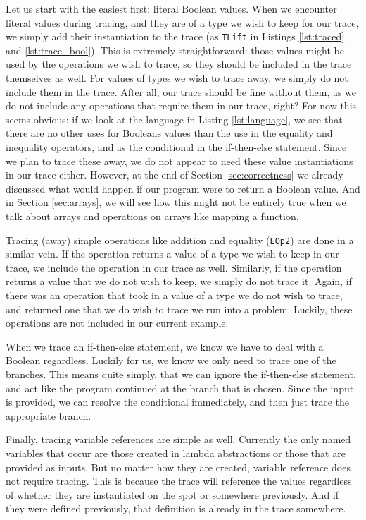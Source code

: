         Let us start with the easiest first: literal Boolean values.
        When we encounter literal values during tracing, and they are of a type we wish to keep for our trace, we simply add their instantiation to the trace (as \texttt{TLift} in Listings \ref{lst:traced} and \ref{lst:trace_bool}).
        This is extremely straightforward: those values might be used by the operations we wish to trace, so they should be included in the trace themselves as well.
        For values of types we wish to trace away, we simply do not include them in the trace.
        After all, our trace should be fine without them, as we do not include any operations that require them in our trace, right?
        For now this seems obvious: if we look at the language in Listing \ref{lst:language}, we see that there are no other uses for Booleans values than the use in the equality and inequality operators, and as the conditional in the if-then-else statement.
        Since we plan to trace these away, we do not appear to need these value instantiations in our trace either.
        However, at the end of Section \ref{sec:correctness} we already discussed what would happen if our program were to return a Boolean value.
        And in Section \ref{sec:arrays}, we will see how this might not be entirely true when we talk about arrays and operations on arrays like mapping a function.
        
        Tracing (away) simple operations like addition and equality (\texttt{EOp2}) are done in a similar vein.
        If the operation returns a value of a type we wish to keep in our trace, we include the operation in our trace as well.
        Similarly, if the operation returns a value that we do not wish to keep, we simply do not trace it.
        Again, if there was an operation that took in a value of a type we do not wish to trace, and returned one that we do wish to trace we run into a problem.
        Luckily, these operations are not included in our current example.

        When we trace an if-then-else statement, we know we have to deal with a Boolean regardless.
        Luckily for us, we know we only need to trace one of the branches.
        This means quite simply, that we can ignore the if-then-else statement, and act like the program continued at the branch that is chosen.
        Since the input is provided, we can resolve the conditional immediately, and then just trace the appropriate branch.

        Finally, tracing variable references are simple as well.
        Currently the only named variables that occur are those created in lambda abstractions or those that are provided as inputs.
        But no matter how they are created, variable reference does not require tracing.
        This is because the trace will reference the values regardless of whether they are instantiated on the spot or somewhere previously.
        And if they were defined previously, that definition is already in the trace somewhere.

